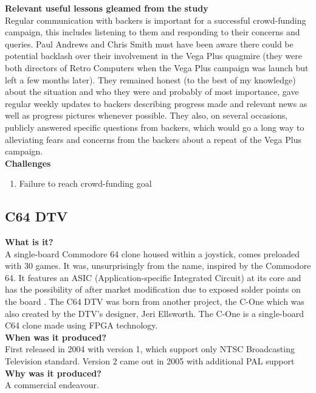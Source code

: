 \textbf{Relevant useful lessons gleamed from the study}\\
Regular communication with backers is important for a successful crowd-funding campaign, this includes listening to them and responding to their concerns and queries. Paul Andrews and Chris Smith must have been aware there could be potential backlash over their involvement in the Vega Plus quagmire (they were both directors of Retro Computers when the Vega Plus campaign was launch but left a few months later). They remained honest (to the best of my knowledge) about the situation and who they were and probably of most importance, gave regular weekly updates to backers describing progress made and relevant news as well as progress pictures whenever possible. They also, on several occasions, publicly answered specific questions from backers, which would go a long way to alleviating fears and concerns from the backers about a repeat of the Vega Plus campaign.  \\

\textbf{Challenges}
\begin{enumerate}
\item Failure to reach crowd-funding goal
\end{enumerate}


\subsection{C64 DTV}
\textbf{What is it?}\\
A single-board Commodore 64 clone housed within a joystick, comes preloaded with 30 games. It was, unsurprisingly from the name, inspired by the Commodore 64. It features an ASIC (Application-specific Integrated Circuit) at its core 
\cite{RN129} and has the possibility of after market modification due to exposed solder points on the board
\cite{RN126}. The C64 DTV was born from another project, the C-One which was also created by the DTV's designer, Jeri Ellsworth. The C-One is a single-board C64 clone made using FPGA technology.\\

\textbf{When was it produced?}\\
First released in 2004 with version 1, which support only NTSC Broadcasting Television standard. Version 2 came out in 2005 with additional PAL support\\

\textbf{Why was it produced?}\\
A commercial endeavour. \\

